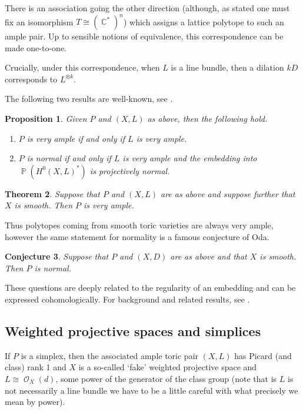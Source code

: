\documentclass[a4paper,11pt]{amsart}
\theoremstyle{plain}
\newtheorem{theorem}{Theorem}[section]
\newtheorem{conjecture}[theorem]{Conjecture}
\newtheorem{proposition}[theorem]{Proposition}
\theoremstyle{definition}
\theoremstyle{remark}
\DeclareMathOperator{\CC}{\mathbb{C}}
\DeclareMathOperator{\PP}{\mathbb{P}}
\DeclareMathOperator{\cO}{\mathcal{O}}
\begin{document}
There is an association going the other direction (although, as stated one must fix an isomorphism $T \cong (\CC^*)^n$) which assigns a lattice polytope to such an ample pair.
Up to sensible notions of equivalence, this correspondence can be made one-to-one.

Crucially, under this correspondence, when $L$ is a line bundle, then a dilation $kD$ corresponds to $L^{\otimes k}$.

The following two results are well-known, see \cite{CoxLittleSchenck:2011}.

\begin{proposition}\label{proposition:toric-polytope-correspondence}
    Given $P$ and $(X,L)$ as above, then the following hold.
    \begin{enumerate}
        \item $P$ is very ample if and only if $L$ is very ample.
        \item $P$ is normal if and only if $L$ is very ample and the embedding into $\PP(H^0(X,L)^*)$ is projectively normal.
    \end{enumerate}
\end{proposition}

\begin{theorem}
    Suppose that $P$ and $(X,L)$ are as above and suppose further that $X$ is smooth.
    Then $P$ is very ample.
\end{theorem}

Thus polytopes coming from smooth toric varieties are always very ample, however the same statement for normality is a famous conjecture of Oda.

\begin{conjecture}
    Suppose that $P$ and $(X,D)$ are as above and that $X$ is smooth.
    Then $P$ is normal.
\end{conjecture}

These questions are deeply related to the regularity of an embedding and can be expressed cohomologically.
For background and related results, see \cite{Hering:Thesis,HerinSchenckSmith:2006,Oberwolfach:2007}.


\subsection{Weighted projective spaces and simplices}\label{subsection:weighted-projective-spaces} \hfill

If $P$ is a simplex, then the associated ample toric pair $(X,L)$ has Picard (and class) rank 1 and $X$ is a so-called `fake' weighted projective space and $L \cong \cO_X(d)$, some power of the generator of the class group (note that is $L$ is not necessarily a line bundle we have to be a little careful with what precisely we mean by power).
\end{document}
